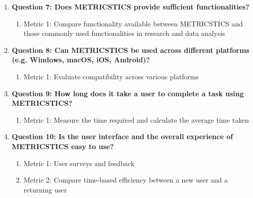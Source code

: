 \begin{enumerate}
    \item \textbf{Question 7: Does METRICSTICS provide sufficient functionalities?}
    \begin{enumerate}
        \item{Metric 1: Compare functionality available between METRICSTICS and those commonly used functionalities in research and data analysis}
    \end{enumerate}
    
    \item \textbf{Question 8: Can METRICSTICS be used across different platforms (e.g. Windows, macOS, iOS, Android)?}
    \begin{enumerate}
        \item{Metric 1: Evaluate compatibility across various platforms}
    \end{enumerate}
    
    \item \textbf{Question 9: How long does it take a user to complete a task using METRICSTICS?}
    \begin{enumerate}
        \item{Metric 1: Measure the time required and calculate the average time taken}
    \end{enumerate}
    
    \item \textbf{Question 10: Is the user interface and the overall experience of METRICSTICS easy to use?}
    \begin{enumerate}
        \item{Metric 1: User surveys and feedback}
        \item{Metric 2: Compare time-based efficiency between a new user and a returning user}
    \end{enumerate}

\end{enumerate}

\pagebreak
